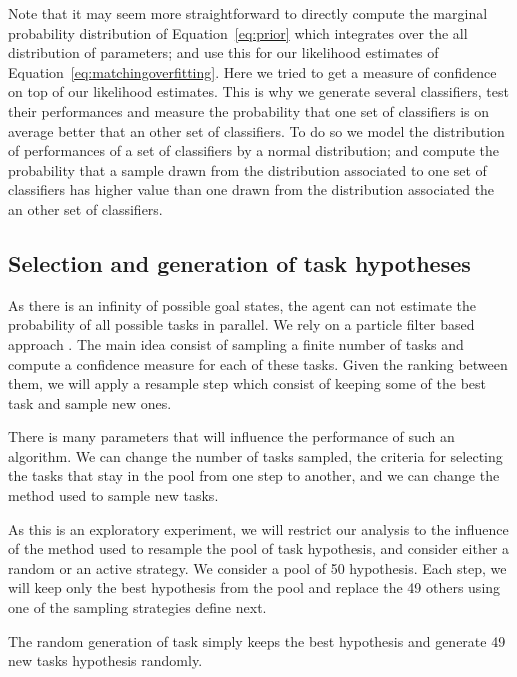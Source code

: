 Note that it may seem more straightforward to directly compute the marginal probability distribution of Equation~\ref{eq:prior} which integrates over the all distribution of parameters; and use this for our likelihood estimates of Equation~\ref{eq:matchingoverfitting}. Here we tried to get a measure of confidence on top of our likelihood estimates. This is why we generate several classifiers, test their performances and measure the probability that one set of classifiers is on average better that an other set of classifiers. To do so we model the distribution of performances of a set of classifiers by a normal distribution; and compute the probability that a sample drawn from the distribution associated to one set of classifiers has higher value than one drawn from the distribution associated the an other set of classifiers.

\subsection{Selection and generation of task hypotheses}
\label{chapter:limitations:continoushypothesis:particlefilter}

As there is an infinity of possible goal states, the agent can not estimate the probability of all possible tasks in parallel. We rely on a particle filter based approach \cite{gordon1993novel,doucet2009tutorial,thrun2002particle}. The main idea consist of sampling a finite number of tasks and compute a confidence measure for each of these tasks. Given the ranking between them, we will apply a resample step which consist of keeping some of the best task and sample new ones.

There is many parameters that will influence the performance of such an algorithm. We can change the number of tasks sampled, the criteria for selecting the tasks that stay in the pool from one step to another, and we can change the method used to sample new tasks. 

As this is an exploratory experiment, we will restrict our analysis to the influence of the method used to resample the pool of task hypothesis, and consider either a random or an active strategy. We consider a pool of 50 hypothesis. Each step, we will keep only the best hypothesis from the pool and replace the 49 others using one of the sampling strategies define next.

The random generation of task simply keeps the best hypothesis and generate 49 new tasks hypothesis randomly.

